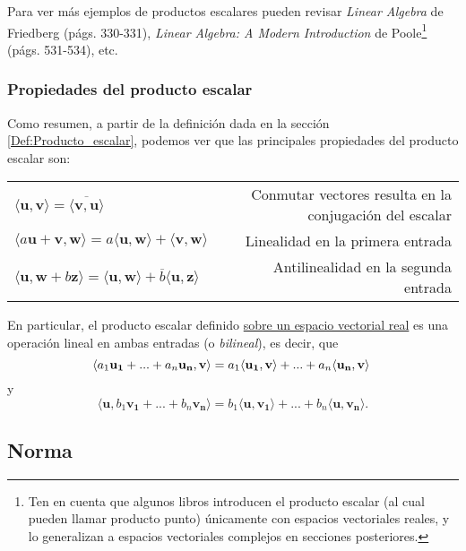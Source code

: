 \documentclass[notasLineal]{subfile}
\begin{document}
\vspace{3mm}

Para ver más ejemplos de productos escalares pueden revisar \emph{Linear Algebra} de Friedberg (págs. 330-331), \textit{Linear Algebra: A Modern Introduction} de Poole\footnote{Ten en cuenta que algunos libros introducen el producto escalar (al cual pueden llamar producto punto) únicamente con espacios vectoriales reales, y lo generalizan a espacios vectoriales complejos en secciones posteriores.} (págs. 531-534), etc.


\subsubsection{Propiedades del producto escalar} \label{Prop:Producto_escalar}

Como resumen, a partir de la definición dada en la sección \ref{Def:Producto_escalar}, podemos ver que las principales propiedades del producto escalar son:

\begin{center}
    \begin{tabular}{lr}
        $\langle\mathbf{u},\mathbf{v}\rangle = \overline{\langle\mathbf{v},\mathbf{u}\rangle}$ & Conmutar vectores resulta en la conjugación del escalar \\
        $\langle a\mathbf{u}+\mathbf{v},\mathbf{w}\rangle = a\langle\mathbf{u},\mathbf{w}\rangle + \langle\mathbf{v},\mathbf{w}\rangle$ & Linealidad en la primera entrada\\
        $\langle\mathbf{u},\mathbf{w}+b\mathbf{z}\rangle = \langle\mathbf{u},\mathbf{w}\rangle + \overline{b}\langle\mathbf{u},\mathbf{z}\rangle$ & Antilinealidad en la segunda entrada\\
    \end{tabular}{}
\end{center}{}

En particular, el producto escalar definido \underline{sobre un espacio vectorial real} es una operación lineal en ambas entradas (o \emph{bilineal}), es decir, que $$\langle a_1\mathbf{u_1}+...+a_n\mathbf{u_n},\mathbf{v}\rangle=a_1\langle\mathbf{u_1},\mathbf{v}\rangle+...+a_n\langle\mathbf{u_n},\mathbf{v}\rangle\hspace{1mm}$$ \noindent y $$\langle\mathbf{u},b_1\mathbf{v_1}+...+b_n\mathbf{v_n}\rangle=b_1\langle\mathbf{u},\mathbf{v_1}\rangle+...+b_n\langle\mathbf{u},\mathbf{v_n}\rangle.$$

\newpage
\subsection*{Norma} \label{Ssec:Norma}
\end{document}
